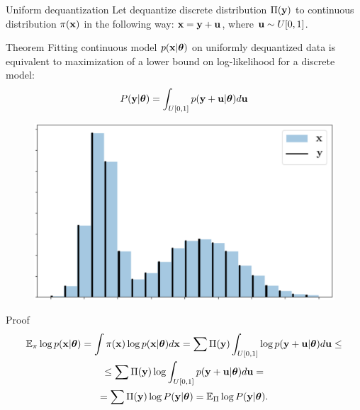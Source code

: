 \begin{frame}{Uniform dequantization}
	Let dequantize discrete distribution $\Pi(\mathbf{y})$ to continuous distribution $\pi(\mathbf{x})$ in the following way: $\mathbf{x} = \mathbf{y} + \mathbf{u}$, where  $\mathbf{u} \sim U[0, 1]$.
	\begin{minipage}{0.7\linewidth}	
		\begin{block}{Theorem}
			Fitting continuous model $p(\mathbf{x} | \boldsymbol{\theta})$ on uniformly dequantized data is equivalent to maximization of a lower bound on log-likelihood for a discrete model:
			\vspace{-0.2cm}
			\[
			P(\mathbf{y} | \boldsymbol{\theta}) = \int_{U[0, 1]} p(\mathbf{y} + \mathbf{u} | \boldsymbol{\theta}) d \mathbf{u}
			\]
			\vspace{-0.5cm} 
		\end{block}
	\end{minipage}%
	\begin{minipage}{0.3\linewidth}
		\begin{figure}
			\centering
			\includegraphics[width=\linewidth,height=0.8\linewidth]{figs/uniform_dequantization.png}
		\end{figure}
	\end{minipage}

	\begin{block}{Proof}
		\vspace{-0.8cm}
		{\small
		\begin{multline*}
			\mathbb{E}_{\pi} \log p(\mathbf{x} | \boldsymbol{\theta}) = \int \pi(\mathbf{x}) \log p(\mathbf{x} | \boldsymbol{\theta}) d \mathbf{x} = \sum \Pi(\mathbf{y}) \int_{U[0,1]} \log p(\mathbf{y} + \mathbf{u} | \boldsymbol{\theta}) d \mathbf{u} \leq \\
			\leq \sum \Pi(\mathbf{y}) \log \int_{U[0,1]}  p(\mathbf{y} + \mathbf{u} | \boldsymbol{\theta}) d \mathbf{u} = \\ = \sum \Pi(\mathbf{y}) \log P(\mathbf{y} | \boldsymbol{\theta}) = \mathbb{E}_{\Pi} \log P(\mathbf{y} | \boldsymbol{\theta}).
		\end{multline*}
		}
	\end{block}
\end{frame}
